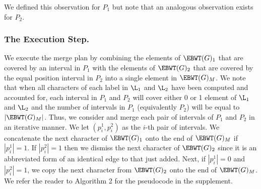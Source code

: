 We defined this observation for $P_1$ but note that an analogous observation exists for $P_2$.



      
   



\subsubsection*{The Execution Step.} 

We execute the merge plan by combining the elements of $\EBWT(G)_1$ that are covered by an interval in $P_1$ with the elements of $\EBWT(G)_2$ that are covered by the equal position interval in $P_2$ into a single element in $\EBWT(G)_M$.  We note that when all characters of each label in $\L_{1}$ and $\L_{2}$ have been computed and accounted for, each interval in $P_1$ and $P_2$ will cover either 0 or 1 element of $\L_{1}$ and $\L_{2}$ and the number of intervals in $P_1$ (equivalently $P_2$) will be equal to $|\EBWT(G)_M|$. Thus, we consider and merge each pair of intervals of $P_1$ and $P_2$ in an iterative manner.  We let  $(p_i^1, p_i^2)$ as the $i$-th pair of intervals.  We concatenate the next character of $\EBWT(G)_1$ onto the end of $\EBWT(G)_M$ if $|p_i^1| = 1$.  If $|p_i^2| = 1$ then we dismiss the next character of  $\EBWT(G)_2$ since it is an abbreviated form of an identical edge to that just added. Next, if $|p_i^1| = 0$ and $|p_i^2| = 1$, we copy the next character from $\EBWT(G)_2$ onto the end of $\EBWT(G)_M$.  We refer the reader to Algorithm 2 for the pseudocode in the supplement.

